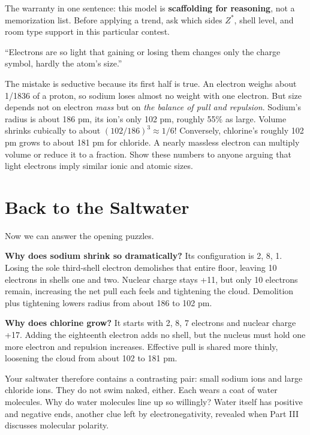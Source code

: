 The warranty in one sentence: this model is \textbf{scaffolding for reasoning}, not a memorization list. Before applying a trend, ask which sides $Z^{*}$, shell level, and room type support in this particular contest.

\begin{wuqu}
``Electrons are so light that gaining or losing them changes only the charge symbol, hardly the atom's size.''

The mistake is seductive because its first half is true. An electron weighs about 1/1836 of a proton, so sodium loses almost no weight with one electron. But size depends not on electron \emph{mass} but on \emph{the balance of pull and repulsion}. Sodium's radius is about 186 pm, its ion's only 102 pm, roughly 55\% as large. Volume shrinks cubically to about $(102/186)^3 \approx 1/6$! Conversely, chlorine's roughly 102 pm grows to about 181 pm for chloride. A nearly massless electron can multiply volume or reduce it to a fraction. Show these numbers to anyone arguing that light electrons imply similar ionic and atomic sizes.
\end{wuqu}

\section{Back to the Saltwater}

Now we can answer the opening puzzles.

\textbf{Why does sodium shrink so dramatically?} Its configuration is 2, 8, 1. Losing the sole third-shell electron demolishes that entire floor, leaving 10 electrons in shells one and two. Nuclear charge stays +11, but only 10 electrons remain, increasing the net pull each feels and tightening the cloud. Demolition plus tightening lowers radius from about 186 to 102 pm.

\textbf{Why does chlorine grow?} It starts with 2, 8, 7 electrons and nuclear charge +17. Adding the eighteenth electron adds no shell, but the nucleus must hold one more electron and repulsion increases. Effective pull is shared more thinly, loosening the cloud from about 102 to 181 pm.

Your saltwater therefore contains a contrasting pair: small sodium ions and large chloride ions. They do not swim naked, either. Each wears a coat of water molecules. Why do water molecules line up so willingly? Water itself has positive and negative ends, another clue left by electronegativity, revealed when Part III discusses molecular polarity.

